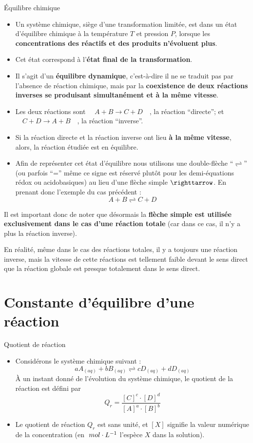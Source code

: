 \documentclass[11pt,a4paper]{article}
\begin{document}
\begin{defn}{Équilibre chimique}
\begin{itemize}
    \item Un système chimique, siège d’une transformation limitée, est dans un état d’équilibre chimique à la température $T$ et pression $P$, lorsque les \textbf{concentrations des réactifs et des produits n’évoluent plus}.  
    \item Cet état correspond à l’\textbf{état final de la transformation}.  
    \item Il s'agit d'un \textbf{équilibre dynamique}, c’est-à-dire il ne se traduit pas par l’absence de réaction chimique, mais par la \textbf{coexistence de deux réactions inverses se produisant simultanément et à la même vitesse}. 
    \item Les deux réactions sont $\quad A+B\longrightarrow C + D \quad $, la réaction ``directe''; et $\quad  C + D \longrightarrow A + B \quad $, la réaction ``inverse''.
    \item Si la réaction directe et la réaction inverse ont lieu \textbf{à la même vitesse}, alors, la réaction étudiée est en équilibre. 
    \item Afin de représenter cet état d’équilibre nous utilisons une double-flèche ``$\rightleftharpoons$'' (ou parfois ``='' même ce signe est réservé plutôt pour les demi-équations rédox ou acidobasiques) au lieu d'une flèche simple $\righttarrow$. En prenant donc l’exemple du cas précédent : \[ A + B \rightleftharpoons C + D \]
\end{itemize}
\end{defn}

Il est important donc de noter que désormais la \textbf{flèche simple est utilisée exclusivement dans le cas d'une réaction totale} (car dans ce cas, il n’y a plus la réaction inverse). 

En réalité, même dans le cas des réactions totales, il y a toujours une réaction inverse, mais la vitesse de cette réactions est tellement faible devant le sens direct que la réaction globale est presque totalement dans le sens direct. 


\section{Constante d'équilibre d'une réaction}

\begin{defn}{Quotient de réaction}
\begin{itemize}
    \item Considérons le système chimique suivant : \[aA_{(aq)} + bB_{(aq)} \rightleftharpoons cD_{(aq)} + dD_{(aq)}\]
    À un instant donné de l'évolution du système chimique, le quotient de la réaction est défini par  
    \[
    Q_r = \dfrac{\left[C\right]^c\cdot\left[D\right]^d}{\left[A\right]^a\cdot\left[B\right]^b}
    \]
    \item Le quotient de réaction $Q_r$  est sans unité, et $[X]$  signifie la valeur numérique de la concentration (en $\; mol\cdot L^{-1}$ l’espèce $X$ dans la solution).
\end{itemize}
\end{defn}
\end{document}
